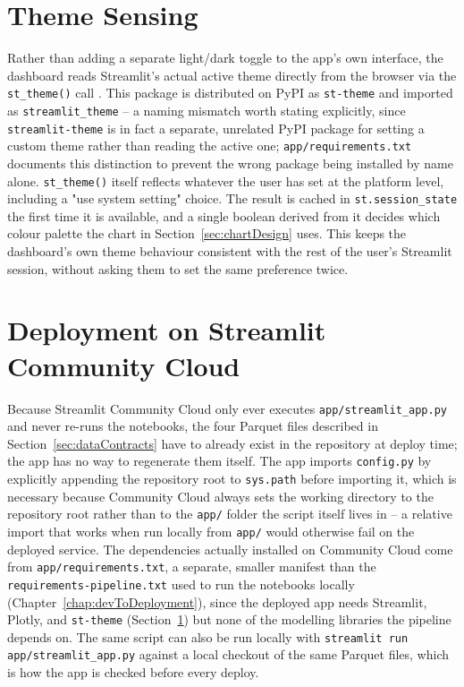 \section{Theme Sensing}
\label{sec:themeSensing}

Rather than adding a separate light/dark toggle to the app's own interface, the dashboard reads Streamlit's actual active theme directly from the browser via the \texttt{st\_theme()} call \cite{StTheme:2026}. This package is distributed on PyPI as \texttt{st-theme} and imported as \texttt{streamlit\_theme} -- a naming mismatch worth stating explicitly, since \texttt{streamlit-theme} is in fact a separate, unrelated PyPI package for setting a custom theme rather than reading the active one; \texttt{app/requirements.txt} documents this distinction to prevent the wrong package being installed by name alone. \texttt{st\_theme()} itself reflects whatever the user has set at the platform level, including a "use system setting" choice. The result is cached in \texttt{st.session\_state} the first time it is available, and a single boolean derived from it decides which colour palette the chart in Section~\ref{sec:chartDesign} uses. This keeps the dashboard's own theme behaviour consistent with the rest of the user's Streamlit session, without asking them to set the same preference twice.

\section{Deployment on Streamlit Community Cloud}
\label{sec:streamlitDeployment}

Because Streamlit Community Cloud only ever executes \texttt{app/streamlit\_app.py} and never re-runs the notebooks, the four Parquet files described in Section~\ref{sec:dataContracts} have to already exist in the repository at deploy time; the app has no way to regenerate them itself. The app imports \texttt{config.py} by explicitly appending the repository root to \texttt{sys.path} before importing it, which is necessary because Community Cloud always sets the working directory to the repository root rather than to the \texttt{app/} folder the script itself lives in -- a relative import that works when run locally from \texttt{app/} would otherwise fail on the deployed service. The dependencies actually installed on Community Cloud come from \texttt{app/requirements.txt}, a separate, smaller manifest than the \texttt{requirements-pipeline.txt} used to run the notebooks locally (Chapter~\ref{chap:devToDeployment}), since the deployed app needs Streamlit, Plotly, and \texttt{st-theme} (Section~\ref{sec:themeSensing}) but none of the modelling libraries the pipeline depends on. The same script can also be run locally with \texttt{streamlit run app/streamlit\_app.py} against a local checkout of the same Parquet files, which is how the app is checked before every deploy.

